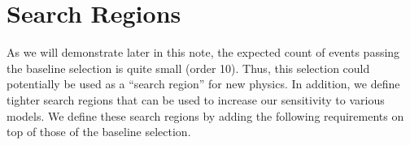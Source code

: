 \section{Search Regions}
\label{sec:regions}

As we will demonstrate later in this note, the 
expected count of events passing the baseline selection 
is quite small (order 10).  Thus, this selection could potentially 
be used as a ``search region'' for new physics.  In addition,
we define tighter search regions that can be used
to increase our sensitivity to various models.
We define these search regions by adding the following requirements
on top of those of the baseline selection.


